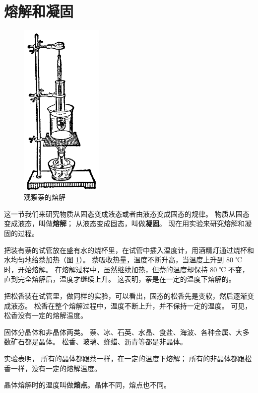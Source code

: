 \section{熔解和凝固}\label{sec:4-1}

\begin{figure}
    \centering
    \includegraphics[width=4cm]{../pic/czwl2-ch4-1}
    \caption{观察萘的熔解}\label{fig:4-1}
\end{figure}

这一节我们来研究物质从固态变成液态或者由液态变成固态的规律。
物质从固态变成液态，叫做\textbf{熔解}；
    从液态变成固态，叫做\textbf{凝固}。
现在用实验来研究熔解和凝固的过程。

把装有萘的试管放在盛有水的烧杯里，在试管中插入温度计，用酒精灯通过烧杯和水均匀地给萘加热（图 \ref{fig:4-1}）。
萘吸收热量，温度不断升高，当温度上升到 80 ℃ 时，开始熔解。
在熔解过程中，虽然继续加热，但萘的温度却保持 80 ℃ 不变，直到完全熔解后，温度才继续上升。
这表明，萘是在一定的温度下熔解的。

把松香装在试管里，做同样的实验，可以看出，固态的松香先是变软，然后逐渐变成液态。
松香在整个熔解过程中，温度不断上升，并不保持一定的温度。
可见，松香没有一定的熔解温度。

固体分晶体和非晶体两类。
萘、冰、石英、水晶、食盐、海波、各种金属、大多数矿石都是晶体。
松香、玻璃、蜂蜡、沥青等都是非晶体。

实验表明，
所有的晶体都跟萘一样，在一定的温度下熔解；
所有的非晶体都跟松香一样，没有一定的熔解温度。

晶体熔解时的温度叫做\textbf{熔点}。晶体不同，熔点也不同。

